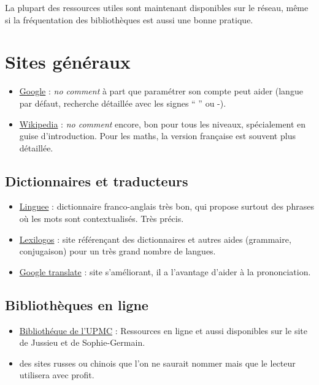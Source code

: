 
La plupart des ressources utiles sont maintenant disponibles sur le réseau,
même si la fréquentation des bibliothèques est aussi une bonne pratique.


\section{Sites généraux}
\begin{itemize}
 \item \href{www.google.com}{Google} : 
\textit{no comment} à part que paramétrer son compte
peut aider (langue par défaut, recherche détaillée avec les signes `` '' ou -).

\item \href{http://wikipedia.org/}{Wikipedia} : \textit{no comment} encore, 
bon pour tous les niveaux, spécialement en guise d'introduction. Pour les maths,
la version française est souvent plus détaillée.

\end{itemize}




\subsection{Dictionnaires et traducteurs}

\begin{itemize}
\item \href{http://www.linguee.com/}{Linguee} : dictionnaire franco-anglais très bon, qui propose 
surtout des phrases où les mots sont contextualisés. Très précis.
\item \href{http://www.lexilogos.com/}{Lexilogos} : site référençant des dictionnaires et autres
aides (grammaire, conjugaison) pour un très grand nombre de langues. 
\item \href{https://translate.google.fr/}{Google translate} : site s'améliorant, 
il a l'avantage d'aider à la prononciation.
\end{itemize}


\subsection{Biblioth\`eques en ligne}

\begin{itemize}

\item \href{http://catalogue-bibliotheques.upmc.fr/#focus}{Biblioth\'eque de l'UPMC} : Ressources en 
ligne et aussi disponibles sur le site de Jussieu et de Sophie-Germain.

\item des sites russes ou chinois que l'on ne saurait nommer mais que le lecteur utilisera avec profit.

\end{itemize}


